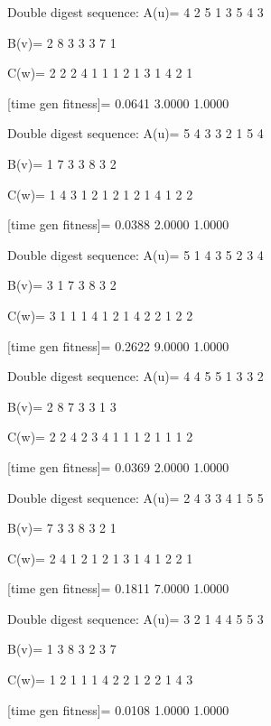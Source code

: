 Double digest sequence:
A(u)=
     4     2     5     1     3     5     4     3

B(v)=
     2     8     3     3     3     7     1

C(w)=
     2     2     2     4     1     1     1     2     1     3     1     4     2     1

[time gen fitness]=
    0.0641    3.0000    1.0000

Double digest sequence:
A(u)=
     5     4     3     3     2     1     5     4

B(v)=
     1     7     3     3     8     3     2

C(w)=
     1     4     3     1     2     1     2     1     2     1     4     1     2     2

[time gen fitness]=
    0.0388    2.0000    1.0000

Double digest sequence:
A(u)=
     5     1     4     3     5     2     3     4

B(v)=
     3     1     7     3     8     3     2

C(w)=
     3     1     1     1     4     1     2     1     4     2     2     1     2     2

[time gen fitness]=
    0.2622    9.0000    1.0000

Double digest sequence:
A(u)=
     4     4     5     5     1     3     3     2

B(v)=
     2     8     7     3     3     1     3

C(w)=
     2     2     4     2     3     4     1     1     1     2     1     1     1     2

[time gen fitness]=
    0.0369    2.0000    1.0000

Double digest sequence:
A(u)=
     2     4     3     3     4     1     5     5

B(v)=
     7     3     3     8     3     2     1

C(w)=
     2     4     1     2     1     2     1     3     1     4     1     2     2     1

[time gen fitness]=
    0.1811    7.0000    1.0000

Double digest sequence:
A(u)=
     3     2     1     4     4     5     5     3

B(v)=
     1     3     8     3     2     3     7

C(w)=
     1     2     1     1     1     4     2     2     1     2     2     1     4     3

[time gen fitness]=
    0.0108    1.0000    1.0000

